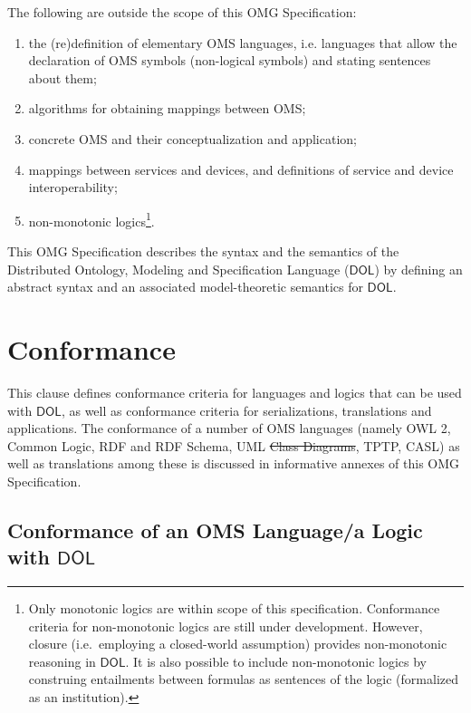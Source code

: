 \documentclass[10pt,fleqn,final]{scrreprt}
\makeatletter
\newcommand*{\ie}{i.e.\@\xspace}
\newcommand*\CommentAuthor{}
\renewcommand*\CommentAuthor{#1}}
\newcommand*\CommentDate{}
\renewcommand*\CommentDate{#1}}
\newcommand*\CommentId{}
\renewcommand*\CommentId{#1}}
\newcommand*\CommentType{}
\renewcommand*\CommentType{#1}}
\newcommand*{\SetCommentColorByType}[1]{%
\edef\localType{{#1}}%
\expandafter\ifstrequal\localType{q-aut}{\colorlet{CommentColor}{red}}{%
\expandafter\ifstrequal\localType{q-all}{\colorlet{CommentColor}{orange}}{%
\expandafter\ifstrequal\localType{todo}{\colorlet{CommentColor}{orange}}{%
\expandafter\ifstrequal\localType{fyi}{\colorlet{CommentColor}{lightgray}}{%
\colorlet{CommentColor}{yellow}}}}}}
\newcommand*{\SetCommentPrefixByType}[1]{%
\edef\localType{{#1}}%
\expandafter\@ifmtarg\localType{%
\edef\CommentPrefix{}%
}{%
\caseupper[q]{#1}%
\edef\CommentPrefix{\thestring: }%
}}
\newcommand*{\initComment}[1]{%
\setkeys{Comment}{#1}%
\SetCommentColorByType{\CommentType}%
\relax%
\SetCommentPrefixByType{\CommentType}%
\relax%
}
\newcommand*{\todonote}[2][]{%
\initComment{#1}%
\pdfcomment[author=\CommentAuthor,color=CommentColor,date=\CommentDate,id=\CommentId]{%
\CommentPrefix
#2}}
\renewcommand*{\todonote}[2][]{%
\initComment{#1}%
\ednote{\CommentPrefix #2}}
\newcommand*{\IS}{OMG Specification\xspace}
\newcommand*{\DOL}{\ensuremath{\mathsf{DOL}}\xspace}
\newcommand{\clause}[1]{\chapter{#1}}
\newcommand{\sclause}[1]{\section{#1}}
\providecommand{\DIFadd}[1]{{\protect\color{blue}\uwave{#1}}} %
\providecommand{\DIFdel}[1]{{\protect\color{red}\sout{#1}}}                      %
\providecommand{\DIFaddbegin}{} %
\providecommand{\DIFaddend}{} %
\providecommand{\DIFdelbegin}{} %
\providecommand{\DIFdelend}{} %
\makeatother
\begin{document}
The following are outside the scope of this \IS:
\begin{enumerate}
\item the (re)definition of elementary OMS languages, \ie languages that allow the declaration of OMS symbols (non-logical symbols) 
and
stating sentences about them;
\item algorithms for obtaining mappings between OMS;
\item concrete OMS and their conceptualization and application;
\item mappings between services and devices, and definitions of service and device interoperability;
\item non-monotonic logics\footnote{Only monotonic logics are within scope of this specification. Conformance criteria for non-monotonic logics are still under development. However, closure (i.e.\ employing a closed-world assumption) provides non-monotonic reasoning in \DOL. It is also possible to include non-monotonic logics by construing entailments between formulas as sentences of the logic (formalized as an institution).}. 

\end{enumerate}

This \IS describes the syntax and the semantics of the Distributed Ontology, Modeling and
Specification Language (\DOL) by defining an abstract syntax and an associated model-theoretic
semantics for \DOL. 


\clause{Conformance}\label{c:conformance}
This clause defines conformance criteria for languages and logics that can be used with \DOL, as well as conformance criteria for
serializations, translations and applications. The conformance of a
number of OMS languages (namely OWL 2, Common Logic, RDF and RDF Schema, 
UML \DIFdelbegin \DIFdel{Class Diagrams}\DIFdelend \DIFaddbegin \DIFadd{class models}\DIFaddend , TPTP, CASL) as well as translations among
these is discussed in informative annexes of this \IS.



\sclause{Conformance of an OMS Language/a Logic with \DOL}\label{c:conform:logic}
\end{document}
